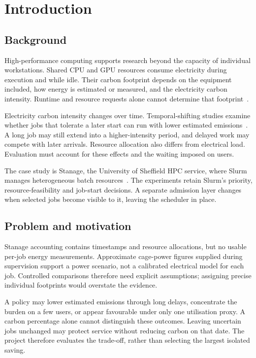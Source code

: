 \chapter{Introduction}\label{ch:introduction}
\section{Background}
High-performance computing supports research beyond the capacity of individual workstations. Shared CPU and GPU resources consume electricity during execution and while idle. Their carbon footprint depends on the equipment included, how energy is estimated or measured, and the electricity carbon intensity. Runtime and resource requests alone cannot determine that footprint~\cite{lannelongue2021green,anthony2020carbontracker}.

Electricity carbon intensity changes over time. Temporal-shifting studies examine whether jobs that tolerate a later start can run with lower estimated emissions~\cite{wiesner2021wait,sukprasert2024limitations}. A long job may still extend into a higher-intensity period, and delayed work may compete with later arrivals. Resource allocation also differs from electrical load. Evaluation must account for these effects and the waiting imposed on users.

The case study is Stanage, the University of Sheffield HPC service, where Slurm manages heterogeneous batch resources~\cite{sheffieldStanage}. The experiments retain Slurm's priority, resource-feasibility and job-start decisions. A separate admission layer changes when selected jobs become visible to it, leaving the scheduler in place.

\section{Problem and motivation}
Stanage accounting contains timestamps and resource allocations, but no usable per-job energy measurements. Approximate cage-power figures supplied during supervision support a power scenario, not a calibrated electrical model for each job. Controlled comparisons therefore need explicit assumptions; assigning precise individual footprints would overstate the evidence.

A policy may lower estimated emissions through long delays, concentrate the burden on a few users, or appear favourable under only one utilisation proxy. A carbon percentage alone cannot distinguish these outcomes. Leaving uncertain jobs unchanged may protect service without reducing carbon on that date. The project therefore evaluates the trade-off, rather than selecting the largest isolated saving.

